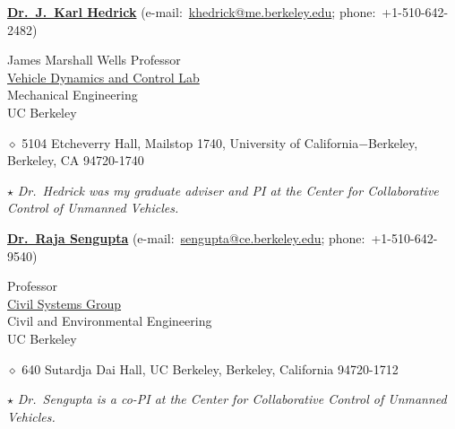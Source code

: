 %
\href{http://www.me.berkeley.edu/faculty/hedrick/}{\textbf{Dr.~J.~Karl Hedrick}}
(e-mail:~\href{mailto:khedrick@me.berkeley.edu}{khedrick@me.berkeley.edu}; phone:~+1-510-642-2482)
%
\begin{innerlist}
    \item James Marshall Wells Professor\\
        \href{http://vehicle.berkeley.edu/}{Vehicle Dynamics and Control Lab}\\
        Mechanical Engineering\\
        UC Berkeley
    \item[$\diamond$] 5104 Etcheverry Hall, Mailstop 1740, University of California$-$Berkeley, Berkeley, CA 94720-1740
    \item[$\star$] \emph{Dr.~Hedrick was my graduate adviser and PI at the Center for Collaborative Control of Unmanned Vehicles.}
\end{innerlist}

\halfblankline

\href{http://www.ce.berkeley.edu/faculty/faculty.php?id=262}{\textbf{Dr.~Raja Sengupta}}
(e-mail:~\href{mailto:sengupta@ce.berkeley.edu}{sengupta@ce.berkeley.edu}; phone:~+1-510-642-9540)
\begin{innerlist}
    \item Professor\\
    	\href{http://www.ce.berkeley.edu/programs/sys/}{Civil Systems Group}\\
        Civil and Environmental Engineering\\
        UC Berkeley
    \item[$\diamond$] 640 Sutardja Dai Hall, UC Berkeley, Berkeley, California 94720-1712 
    \item[$\star$] \emph{Dr.~Sengupta is a co-PI at the Center for Collaborative Control of Unmanned Vehicles.}
\end{innerlist}

\halfblankline

%

